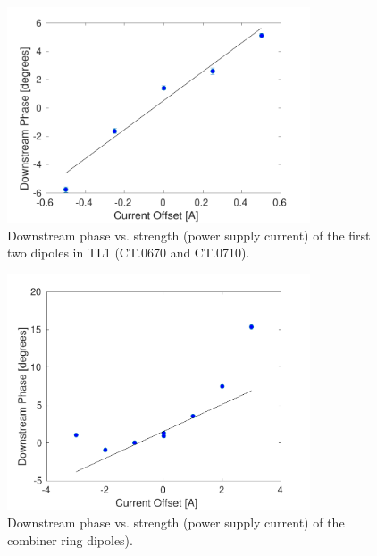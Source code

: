 
\begin{figure}
  \centering
  \includegraphics[width=0.8\textwidth]{Figures/propagation/tl1670}
  \caption{Downstream phase vs. strength (power supply current) of the first two dipoles in TL1 (CT.0670 and CT.0710).}
  \label{f:tl1670}
\end{figure}


\begin{figure}
  \centering
  \includegraphics[width=0.8\textwidth]{Figures/propagation/crBends}
  \caption{Downstream phase vs. strength (power supply current) of the combiner ring dipoles).}
  \label{f:crBends}
\end{figure}

